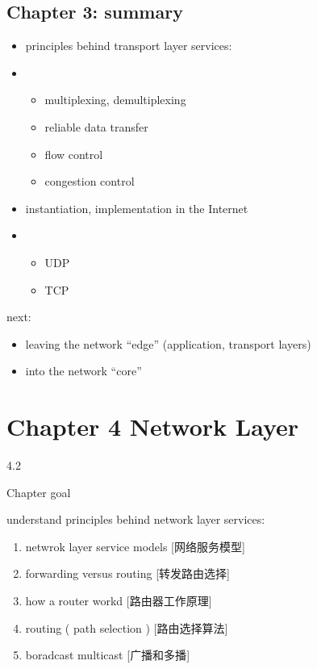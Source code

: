 \documentclass[
]{article}
\begin{document}
\hypertarget{chapter-3-summary}{%
\subsection{Chapter 3: summary}\label{chapter-3-summary}}

\begin{itemize}
\item
  principles behind transport layer services:
\item
  \begin{itemize}
  \item
    multiplexing, demultiplexing
  \item
    reliable data transfer
  \item
    flow control
  \item
    congestion control
  \end{itemize}
\item
  instantiation, implementation in the Internet
\item
  \begin{itemize}
  \item
    UDP
  \item
    TCP
  \end{itemize}
\end{itemize}

next:

\begin{itemize}
\item
  leaving the network ``edge'' (application, transport layers)
\item
  into the network ``core''
\end{itemize}

\hypertarget{chapter-4-network-layer}{%
\section{Chapter 4 Network Layer}\label{chapter-4-network-layer}}

4.2

Chapter goal

understand principles behind network layer services:

\begin{enumerate}
\def\labelenumi{\arabic{enumi}.}
\item
  netwrok layer service models {[}网络服务模型{]}
\item
  forwarding versus routing {[}转发路由选择{]}
\item
  how a router workd {[}路由器工作原理{]}
\item
  routing ( path selection ) {[}路由选择算法{]}
\item
  boradcast multicast {[}广播和多播{]}
\end{enumerate}
\end{document}
